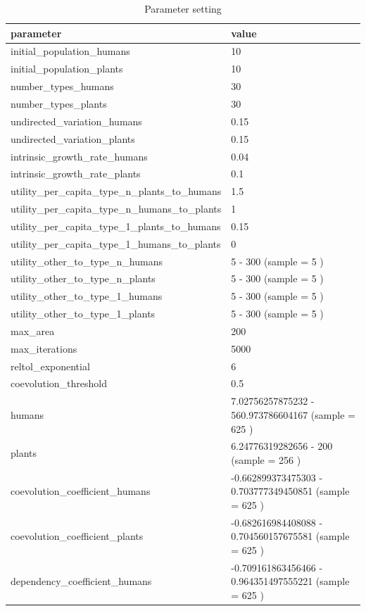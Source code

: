 \documentclass[
]{book}
\begin{document}
\begin{table}[!h]

\caption{\label{tab:4UbHUbPtablepdf}Parameter setting}
\centering
\begin{tabular}[t]{l|l}
\hline
parameter & value\\
\hline
initial\_population\_humans & 10\\
\hline
initial\_population\_plants & 10\\
\hline
number\_types\_humans & 30\\
\hline
number\_types\_plants & 30\\
\hline
undirected\_variation\_humans & 0.15\\
\hline
undirected\_variation\_plants & 0.15\\
\hline
intrinsic\_growth\_rate\_humans & 0.04\\
\hline
intrinsic\_growth\_rate\_plants & 0.1\\
\hline
utility\_per\_capita\_type\_n\_plants\_to\_humans & 1.5\\
\hline
utility\_per\_capita\_type\_n\_humans\_to\_plants & 1\\
\hline
utility\_per\_capita\_type\_1\_plants\_to\_humans & 0.15\\
\hline
utility\_per\_capita\_type\_1\_humans\_to\_plants & 0\\
\hline
utility\_other\_to\_type\_n\_humans & 5 - 300 (sample = 5 )\\
\hline
utility\_other\_to\_type\_n\_plants & 5 - 300 (sample = 5 )\\
\hline
utility\_other\_to\_type\_1\_humans & 5 - 300 (sample = 5 )\\
\hline
utility\_other\_to\_type\_1\_plants & 5 - 300 (sample = 5 )\\
\hline
max\_area & 200\\
\hline
max\_iterations & 5000\\
\hline
reltol\_exponential & 6\\
\hline
coevolution\_threshold & 0.5\\
\hline
humans & 7.02756257875232 - 560.973786604167 (sample = 625 )\\
\hline
plants & 6.24776319282656 - 200 (sample = 256 )\\
\hline
coevolution\_coefficient\_humans & -0.662899373475303 - 0.703777349450851 (sample = 625 )\\
\hline
coevolution\_coefficient\_plants & -0.682616984408088 - 0.704560157675581 (sample = 625 )\\
\hline
dependency\_coefficient\_humans & -0.709161863456466 - 0.964351497555221 (sample = 625 )\\

\end{tabular}
\end{table}
\end{document}

